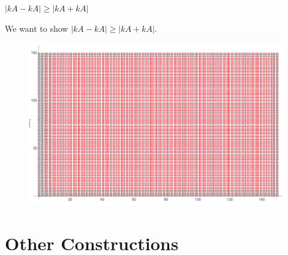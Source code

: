\documentclass[11pt]{beamer}
\begin{document}
\begin{frame}{$|kA-kA| \geq |kA+kA|$}

We want to show $|kA-kA| \geq |kA+kA|$.

\pause

\begin{figure}
    \centering
    \includegraphics[scale=.35]{stabilized_set.png}
    \label{fig:stablized set-2}
\end{figure}
    
\end{frame}

\section{Other Constructions}
\end{document}
